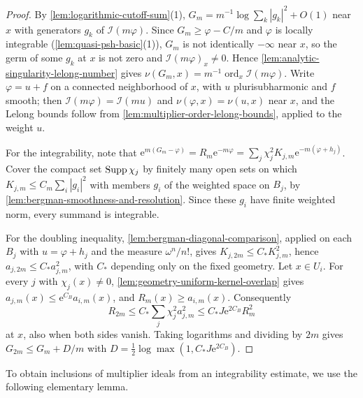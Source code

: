 \begin{proof}
By \cref{lem:logarithmic-cutoff-sum}(1), $G_m=m^{-1}\log\sum_k|g_k|^2+O(1)$ near $x$ with generators $g_k$ of $\mathcal I(m\varphi)$. Since $G_m\geq\varphi-C/m$ and $\varphi$ is locally integrable (\cref{lem:quasi-psh-basic}(1)), $G_m$ is not identically $-\infty$ near $x$, so the germ of some $g_k$ at $x$ is not zero and $\mathcal I(m\varphi)_x\neq0$. Hence \cref{lem:analytic-singularity-lelong-number} gives $\nu(G_m,x)=m^{-1}\operatorname{ord}_x\mathcal I(m\varphi)$. Write $\varphi=u+f$ on a connected neighborhood of $x$, with $u$ plurisubharmonic and $f$ smooth; then $\mathcal I(m\varphi)=\mathcal I(mu)$ and $\nu(\varphi,x)=\nu(u,x)$ near $x$, and the Lelong bounds follow from \cref{lem:multiplier-order-lelong-bounds}, applied to the weight $u$.

For the integrability, note that $\mathrm e^{m(G_m-\varphi)}=R_m\mathrm e^{-m\varphi}=\sum_j\chi_j^2K_{j,m}\mathrm e^{-m(\varphi+h_j)}$. Cover the compact set $\operatorname{Supp}\chi_j$ by finitely many open sets on which $K_{j,m}\leq C_m\sum_i|g_i|^2$ with members $g_i$ of the weighted space on $B_j$, by \cref{lem:bergman-smoothness-and-resolution}. Since these $g_i$ have finite weighted norm, every summand is integrable.

For the doubling inequality, \cref{lem:bergman-diagonal-comparison}, applied on each $B_j$ with $u=\varphi+h_j$ and the measure $\omega^n/n!$, gives $K_{j,2m}\leq C_*K_{j,m}^2$, hence $a_{j,2m}\leq C_*a_{j,m}^2$, with $C_*$ depending only on the fixed geometry. Let $x\in U_i$. For every $j$ with $\chi_j(x)\neq0$, \cref{lem:geometry-uniform-kernel-overlap} gives $a_{j,m}(x)\leq\mathrm e^{C_B}a_{i,m}(x)$, and $R_m(x)\geq a_{i,m}(x)$. Consequently
\[
 R_{2m}\leq C_*\sum_j\chi_j^2a_{j,m}^2
        \leq C_*J\mathrm e^{2C_B}R_m^2
\]
at $x$, also when both sides vanish. Taking logarithms and dividing by $2m$ gives $G_{2m}\leq G_m+D/m$ with $D=\frac12\log\max(1,C_*J\mathrm e^{2C_B})$.
\end{proof}

To obtain inclusions of multiplier ideals from an integrability estimate, we use the following elementary lemma.

